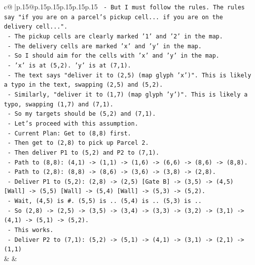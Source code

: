 \documentclass{article}
\begin{document}
{\begin{supertabular}{c@{$\;$}|p{.15\linewidth}@{}p{.15\linewidth}p{.15\linewidth}p{.15\linewidth}p{.15\linewidth}p{.15\linewidth}}
{{{\texttt{       {-} But I must follow the rules. The rules say "if you are on a parcel's pickup cell... if you are on the delivery cell...".} \\
\texttt{       {-} The pickup cells are clearly marked '1' and '2' in the map.} \\
\texttt{       {-} The delivery cells are marked 'x' and 'y' in the map.} \\
\texttt{       {-} So I should aim for the cells with 'x' and 'y' in the map.} \\
\texttt{       {-} 'x' is at (5,2). 'y' is at (7,1).} \\
\texttt{       {-} The text says "deliver it to (2,5) (map glyph 'x')". This is likely a typo in the text, swapping (2,5) and (5,2).} \\
\texttt{       {-} Similarly, "deliver it to (1,7) (map glyph 'y')". This is likely a typo, swapping (1,7) and (7,1).} \\
\texttt{       {-} So my targets should be (5,2) and (7,1).} \\
\texttt{       {-} Let's proceed with this assumption.} \\
\texttt{       {-} Current Plan: Get to (8,8) first.} \\
\texttt{       {-} Then get to (2,8) to pick up Parcel 2.} \\
\texttt{       {-} Then deliver P1 to (5,2) and P2 to (7,1).} \\
\texttt{       {-} Path to (8,8): (4,1) {-}> (1,1) {-}> (1,6) {-}> (6,6) {-}> (8,6) {-}> (8,8).} \\
\texttt{       {-} Path to (2,8): (8,8) {-}> (8,6) {-}> (3,6) {-}> (3,8) {-}> (2,8).} \\
\texttt{       {-} Deliver P1 to (5,2): (2,8) {-}> (2,5) {[}Gate B{]} {-}> (3,5) {-}> (4,5) {[}Wall{]} {-}> (5,5) {[}Wall{]} {-}> (5,4) {[}Wall{]} {-}> (5,3) {-}> (5,2).} \\
\texttt{         {-} Wait, (4,5) is \#. (5,5) is .. (5,4) is .. (5,3) is ..} \\
\texttt{         {-} So (2,8) {-}> (2,5) {-}> (3,5) {-}> (3,4) {-}> (3,3) {-}> (3,2) {-}> (3,1) {-}> (4,1) {-}> (5,1) {-}> (5,2).} \\
\texttt{         {-} This works.} \\
\texttt{       {-} Deliver P2 to (7,1): (5,2) {-}> (5,1) {-}> (4,1) {-}> (3,1) {-}> (2,1) {-}> (1,1)} \\
            }
        }
    }
    & & \\ \\


\end{supertabular}}
\end{document}
